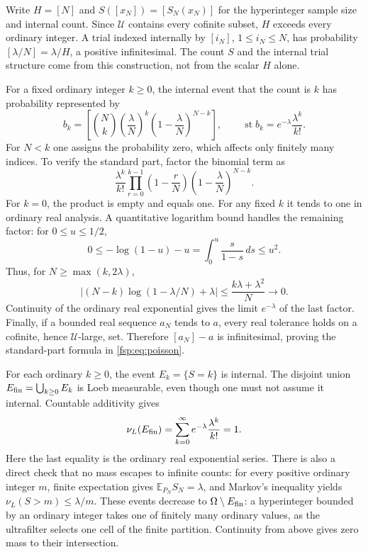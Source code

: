 \documentclass[11pt,a4paper]{article}
\numberwithin{equation}{section}
\theoremstyle{definition}
\theoremstyle{remark}
\newcommand{\E}{\mathbb E}
\newcommand{\st}{\operatorname{st}}
\begin{document}
Write $H=[N]$ and $S([x_N])=[S_N(x_N)]$ for the hyperinteger sample size
and internal count. Since $\mathcal U$ contains every cofinite subset,
$H$ exceeds every ordinary integer. A trial indexed internally by
$[i_N]$, $1\le i_N\le N$, has probability $[\lambda/N]=\lambda/H$,
a positive infinitesimal. The count $S$ and the internal trial structure
come from this construction, not from the scalar $H$ alone.

For a fixed ordinary integer $k\ge0$, the internal event that the count
is $k$ has probability represented by
\begin{equation}\label{fsp:eq:poisson}
 b_k=\left[
 \binom Nk\left(\frac\lambda N\right)^k
           \left(1-\frac\lambda N\right)^{N-k}
 \right],
 \qquad
 \st b_k=e^{-\lambda}\frac{\lambda^k}{k!}.
\end{equation}
For $N<k$ one assigns the probability zero, which affects only finitely
many indices. To verify the standard part, factor the binomial term as
\begin{equation}
 \frac{\lambda^k}{k!}
 \prod_{r=0}^{k-1}\left(1-\frac rN\right)
 \left(1-\frac\lambda N\right)^{N-k}.
\end{equation}
For $k=0$, the product is empty and equals one. For any fixed $k$ it
tends to one in ordinary real analysis. A quantitative logarithm bound
handles the remaining factor: for $0\le u\le1/2$,
\[
 0\le-\log(1-u)-u=\int_0^u\frac{s}{1-s}\,ds\le u^2.
\]
Thus, for $N\ge\max(k,2\lambda)$,
\[
 \bigl|(N-k)\log(1-\lambda/N)+\lambda\bigr|
 \le\frac{k\lambda+\lambda^2}{N}\longrightarrow0.
\]
Continuity of the ordinary real exponential gives the limit
$e^{-\lambda}$ of the last factor. Finally, if a bounded real sequence
$a_N$ tends to $a$, every real tolerance holds on a cofinite, hence
$\mathcal U$-large, set. Therefore $[a_N]-a$ is infinitesimal, proving
the standard-part formula in \eqref{fsp:eq:poisson}.

For each ordinary $k\ge0$, the event $E_k=\{S=k\}$ is internal.
The disjoint union $E_{\rm fin}=\bigcup_{k\ge0}E_k$ is Loeb measurable,
even though one must not assume it internal. Countable additivity gives
\[
 \nu_L(E_{\rm fin})
 =\sum_{k=0}^{\infty}e^{-\lambda}\frac{\lambda^k}{k!}=1.
\]
Here the last equality is the ordinary real exponential series.
There is also a direct check that no mass escapes to infinite counts:
for every positive ordinary integer $m$, finite expectation gives
$\E_{P_N}S_N=\lambda$, and Markov's inequality yields
$\nu_L(S>m)\le\lambda/m$. These events decrease to
$\Omega\setminus E_{\rm fin}$: a hyperinteger bounded by an ordinary
integer takes one of finitely many ordinary values, as the ultrafilter
selects one cell of the finite partition. Continuity from above gives
zero mass to their intersection.
\end{document}
